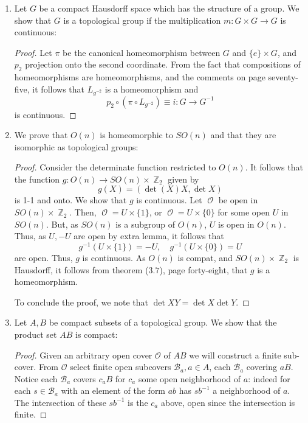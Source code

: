 \documentclass{book}
\DeclareMathOperator*{\Ocal}{\mathcal{O}}
\DeclareMathOperator*{\Z}{\mathbb{Z}}
\newcommand\red[1]{{\color{red} #1}}
\begin{document}
\begin{enumerate}[(1)]
    \item Let $G$ be a compact Hausdorff space which has the structure of a group. We show that $G$ is a topological group if the multiplication $m: G \times G \rightarrow G$ is continuous:  
        \begin{proof}Let $\pi$ be the canonical homeomorphism between $G$ and $\{e\} \times G$, and $p_2$ projection onto the second coordinate. From the fact that compositions of homeomorphisms are homeomorphisms, and the comments on page seventy-five, it follows that $L_{g^{-2}}$ is a homeomorphism and 
            \[p_2 \circ (\pi \circ L_{g^{-2}}) \equiv i: G \rightarrow G^{-1}\] is continuous. 
        \end{proof}

    \item We prove that $O(n)$ is homeomorphic to $SO(n)$ and that they are isomorphic as topological groups: 
        \begin{proof} Consider the determinate function restricted to $O(n)$. It follows that the function $g: O(n) \rightarrow SO(n) \times \Z_2$ given by 
            \[g(X) = (\det(X) X , \det X)\]
            is 1-1 and onto. We show that $g$ is continuous. Let $\Ocal$ be open in $SO(n) \times \Z_2$. Then, $\Ocal = U \times \{1\}$, or $\Ocal = U \times \{0\}$ for some open $U$ in $SO(n)$. But, as $SO(n)$ is a subgroup of $O(n)$, $U$ is open in $O(n)$. Thus, as $U, -U$ are open by extra lemma, it follows that 
            \[g^{-1}(U \times \{1\}) = -U, \quad g^{-1}(U \times \{0\}) = U\]
            are open. Thus, $g$ is continuous. As $O(n)$ is compat, and $SO(n) \times \Z_2$ is Hausdorff, it follows from theorem ($3.7$), page forty-eight, that $g$ is a homeomorphism. 
            \par To conclude the proof, we note that $\det XY = \det X \det Y$.  
        \end{proof}

    \item Let $A,B$ be compact subsets of a topological group. We show that the product set $AB$ is compact: 
        \red { \begin{proof} 
            Given an arbitrary open cover $\mathcal{O}$ of $AB$ we will construct a finite sub-cover.
            From $\mathcal{O}$ select finite open subcovers $\mathcal{B}_a, a\in A$, each $\mathcal{B}_a$ covering $aB$. 
            Notice each $\mathcal{B}_a$ covers $c_aB$ for $c_a$ some open neighborhood of $a$: 
            indeed for each $s\in \mathcal{B}_a$ with an element of the form $ab$ has $sb^{-1}$ a neighborhood of $a$. 
            The intersection of these $sb^{-1}$ is the $c_a$ above, open since the intersection is finite.


\end{proof}}
\end{enumerate}
\end{document}
